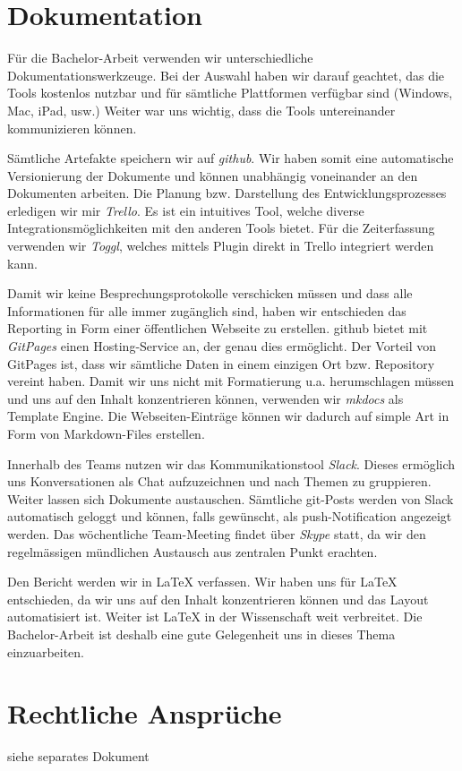 \section{Dokumentation}

Für die Bachelor-Arbeit verwenden wir unterschiedliche Dokumentationswerkzeuge. Bei der Auswahl haben wir darauf geachtet, das die Tools kostenlos nutzbar und für sämtliche Plattformen verfügbar sind (Windows, Mac, iPad, usw.) Weiter war uns wichtig, dass die Tools untereinander kommunizieren können. 

Sämtliche Artefakte speichern wir auf \textit{github}. Wir haben somit eine automatische Versionierung der Dokumente und können unabhängig voneinander an den Dokumenten arbeiten. Die Planung bzw. Darstellung des Entwicklungsprozesses erledigen wir mir \textit{Trello}. Es ist ein intuitives Tool, welche diverse Integrationsmöglichkeiten mit den anderen Tools bietet. Für die Zeiterfassung verwenden wir \textit{Toggl}, welches mittels Plugin direkt in Trello integriert werden kann.

Damit wir keine Besprechungsprotokolle verschicken müssen und dass alle Informationen für alle immer zugänglich sind, haben wir entschieden das Reporting in Form einer öffentlichen Webseite zu erstellen. github bietet mit \textit{GitPages} einen Hosting-Service an, der genau dies ermöglicht. Der Vorteil von GitPages ist, dass wir sämtliche Daten in einem einzigen Ort bzw. Repository vereint haben. Damit wir uns nicht mit Formatierung u.a. herumschlagen müssen und uns auf den Inhalt konzentrieren können, verwenden wir \textit{mkdocs} als Template Engine. Die Webseiten-Einträge können wir dadurch auf simple Art in Form von Markdown-Files erstellen.

Innerhalb des Teams nutzen wir das Kommunikationstool \textit{Slack}. Dieses ermöglich uns Konversationen als Chat aufzuzeichnen und nach Themen zu gruppieren. Weiter lassen sich Dokumente austauschen. Sämtliche git-Posts werden von Slack automatisch geloggt und können, falls gewünscht, als push-Notification angezeigt werden.
Das wöchentliche Team-Meeting findet über \textit{Skype} statt, da wir den regelmässigen mündlichen Austausch aus zentralen Punkt erachten.

Den Bericht werden wir in LaTeX verfassen. Wir haben uns für LaTeX entschieden, da wir uns auf den Inhalt konzentrieren können und das Layout automatisiert ist. Weiter ist LaTeX in der Wissenschaft weit verbreitet. Die Bachelor-Arbeit ist deshalb eine gute Gelegenheit uns in dieses Thema einzuarbeiten.


\section{Rechtliche Ansprüche}
siehe separates Dokument

